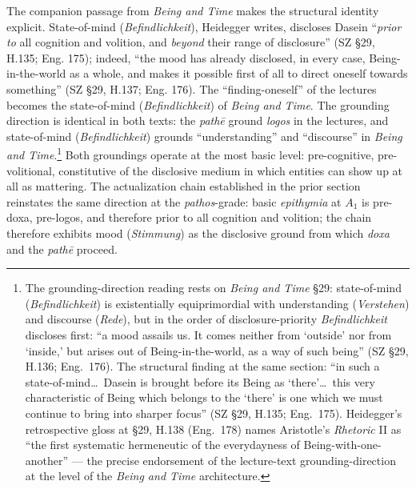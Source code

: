 \documentclass{article}
\begin{document}
 The companion passage from \textit{Being and Time} makes the structural identity explicit. State-of-mind (\textit{Befindlichkeit}), Heidegger writes, discloses Dasein ``\textit{prior to} all cognition and volition, and \textit{beyond} their range of disclosure'' (SZ \S29, H.135; Eng. 175); indeed, ``the mood has already disclosed, in every case, Being-in-the-world as a whole, and makes it possible first of all to direct oneself towards something'' (SZ \S29, H.137; Eng. 176). The ``finding-oneself'' of the lectures becomes the state-of-mind (\textit{Befindlichkeit}) of \textit{Being and Time}. The grounding direction is identical in both texts: the \textit{pathē} ground \textit{logos} in the lectures, and state-of-mind (\textit{Befindlichkeit}) grounds ``understanding'' and ``discourse'' in \textit{Being and Time}.\footnote{The grounding-direction reading rests on \textit{Being and Time} \S 29: state-of-mind (\textit{Befindlichkeit}) is existentially equiprimordial with understanding (\textit{Verstehen}) and discourse (\textit{Rede}), but in the order of disclosure-priority \textit{Befindlichkeit} discloses first: ``a mood assails us. It comes neither from `outside' nor from `inside,' but arises out of Being-in-the-world, as a way of such being'' (SZ \S 29, H.136; Eng.~176). The structural finding at the same section: ``in such a state-of-mind\ldots\ Dasein is brought before its Being as `there'\ldots\ this very characteristic of Being which belongs to the `there' is one which we must continue to bring into sharper focus'' (SZ \S 29, H.135; Eng.~175). Heidegger's retrospective gloss at \S 29, H.138 (Eng.~178) names Aristotle's \textit{Rhetoric} II as ``the first systematic hermeneutic of the everydayness of Being-with-one-another'' --- the precise endorsement of the lecture-text grounding-direction at the level of the \textit{Being and Time} architecture.} Both groundings operate at the most basic level: pre-cognitive, pre-volitional, constitutive of the disclosive medium in which entities can show up at all as mattering. The actualization chain established in the prior section reinstates the same direction at the \textit{pathos}-grade: basic \textit{epithymia} at $A_1$ is pre-doxa, pre-logos, and therefore prior to all cognition and volition; the chain therefore exhibits mood (\textit{Stimmung}) as the disclosive ground from which \textit{doxa} and the \textit{pathē} proceed.
\end{document}
